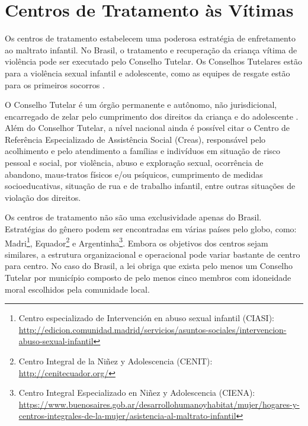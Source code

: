 


\section{Centros de Tratamento às Vítimas}\label{sec:centros}


Os centros de tratamento estabelecem uma poderosa estratégia de enfretamento ao maltrato infantil. No Brasil, o tratamento e recuperação da criança vítima de violência pode ser executado pelo Conselho Tutelar. Os Conselhos Tutelares estão para a violência sexual infantil e adolescente, como as equipes de resgate estão para os primeiros socorros \cite{caccia2014conselheiros}.


O Conselho Tutelar é um órgão permanente e autônomo, não jurisdicional, encarregado de zelar pelo cumprimento dos direitos da criança e do adolescente \cite{saude2002notificacao}. Além do Conselhor Tutelar, a nível nacional ainda é possível citar o Centro de Referência Especializado de Assistência Social (Creas), responsável pelo acolhimento e pelo atendimento a famílias e indivíduos em situação de risco pessoal e social, por violência, abuso e exploração sexual, ocorrência de abandono, maus-tratos físicos e/ou psíquicos, cumprimento de medidas socioeducativas, situação de rua e de trabalho infantil, entre outras situações de violação dos direitos.

Os centros de tratamento não são uma exclusividade apenas do Brasil. Estratégias do gênero podem ser encontradas em várias países pelo globo, como: Madri\footnote{ Centro especializado de Intervención en abuso sexual infantil (CIASI): \url{http://edicion.comunidad.madrid/servicios/asuntos-sociales/intervencion-abuso-sexual-infantil}}, Equador\footnote{Centro Integral de la Niñez y Adolescencia (CENIT): \url{http://cenitecuador.org/}} %
e Argentinha\footnote{Centro Integral Especializado en Niñez y Adolescencia (CIENA): \url{https://www.buenosaires.gob.ar/desarrollohumanoyhabitat/mujer/hogares-y-centros-integrales-de-la-mujer/asistencia-al-maltrato-infantil}}. Embora os objetivos dos centros sejam similares, a estrutura organizacional e operacional pode variar bastante de centro para centro. No caso do Brasil, a lei obriga que exista pelo menos um Conselho Tutelar por município composto de pelo menos cinco membros com idoneidade moral escolhidos pela comunidade local. %


